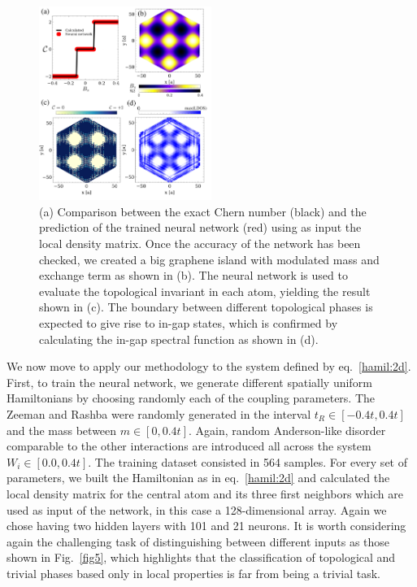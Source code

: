 \begin{figure}[t!]
\centering
\includegraphics[width=0.5\textwidth]{ann/figures/fig6.pdf}
\caption{
(a) Comparison between the exact Chern number (black) and the prediction of the
trained neural network (red) using as input the local density matrix. Once the
accuracy of the network has been checked, we created a big graphene island with
modulated mass and exchange term as shown in (b). The neural network is used
to evaluate the topological invariant in each atom, yielding the result shown
in (c). The boundary between different topological phases is expected to give
rise to in-gap states, which is confirmed by calculating the in-gap spectral
function as shown in (d).
}
\label{DOS_fig}
\label{fig6}
\end{figure}

We now move to apply our methodology to the system defined by
eq.~\eqref{hamil:2d}.
First, to train the neural network, we generate different spatially uniform
Hamiltonians by choosing randomly each of the coupling parameters. The Zeeman
and Rashba were randomly generated in the interval $t_R\in[-0.4t,0.4t]$ and the mass
between $m\in[0,0.4t]$. Again, random Anderson-like disorder comparable to the other
interactions are introduced all across the system $W_i\in [0.0,0.4t]$.
The training dataset consisted in 564 samples. 
For every set of parameters, we built the Hamiltonian as in eq.~\eqref{hamil:2d}
and calculated the local density matrix for the central atom and its three first
neighbors which are used as input of the network, in this case a 128-dimensional
array.
Again we chose having two hidden layers with 101 and 21 neurons.
It is worth considering again the challenging task of distinguishing
between different inputs as those shown in Fig.~\ref{fig5}, which
highlights that the classification of topological and trivial phases based only
in local properties is far from being a trivial task.

